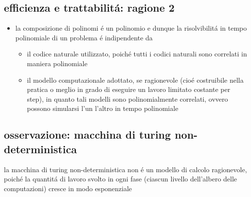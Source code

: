 
\subsection*{efficienza e trattabilit\'a: ragione 2}
\begin{flushleft}
	\begin{itemize}
		\item la composizione di polinomi \'e un polinomio e dunque la risolvibilit\'a in tempo polinomiale di un problema \'e indipendente da
		\begin{itemize}
			\item il codice naturale utilizzato, poich\'e tutti i codici naturali sono correlati in maniera polinomiale
			\item il modello computazionale adottato, se ragionevole (cio\'e costruibile nella pratica o meglio in grado di eseguire un lavoro limitato costante per step), in quanto tali modelli sono polinomialmente correlati, ovvero possono simularsi l'un l'altro in tempo polinomiale
		\end{itemize}
	\end{itemize}
\end{flushleft}


\subsection*{osservazione: macchina di turing non-deterministica}
\begin{flushleft}
	la macchina di turing non-deterministica non \'e un modello di calcolo ragionevole, poich\'e la quantit\'a di lavoro svolto in ogni fase (ciascun livello dell'albero delle computazioni) cresce in modo esponenziale
\end{flushleft}


